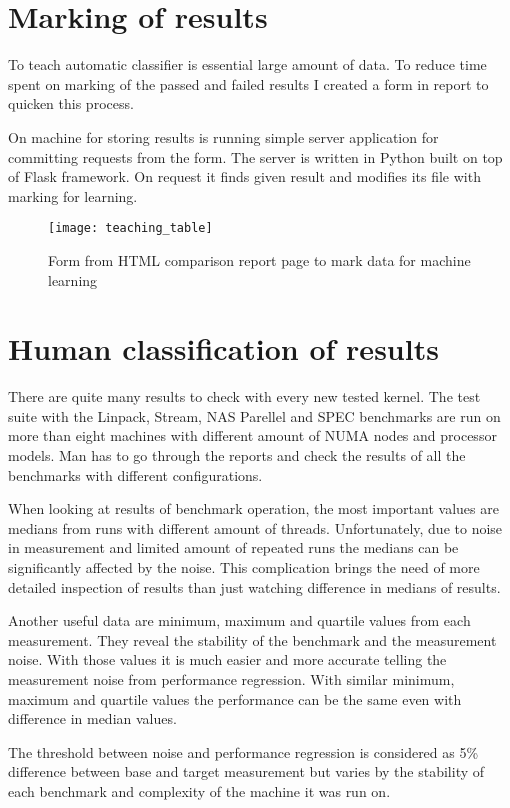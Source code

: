 \section{Marking of results}
To teach automatic classifier is essential large amount of data. To reduce
time spent on marking of the passed and failed results I created a form in
report to quicken this process.

On machine for storing results is running simple server application for
committing requests from the form. The server is written in Python built on top
of Flask framework. On request it finds given result and modifies its file with
marking for learning.

\begin{figure}
  \centering
  \texttt{[image: teaching\_table]}
  \caption{Form from HTML comparison report page to mark data for machine learning}
\end{figure}

\section{Human classification of results}
There are quite many results to check with every new tested kernel. The test
suite with the Linpack, Stream, NAS Parellel and SPEC benchmarks are run on more
than eight machines with different amount of NUMA nodes and processor models.
Man has to go through the reports and check the results of all the benchmarks
with different configurations.

When looking at results of benchmark operation, the most important values are
medians from runs with different amount of threads. Unfortunately, due to noise in measurement
and limited amount of repeated runs the medians can be significantly affected by
the noise. This complication brings the need of more detailed inspection of
results than just watching difference in medians of results.

Another useful data are minimum, maximum and quartile values from each
measurement. They reveal the stability of the benchmark and the measurement
noise. With those values it is much easier and more accurate telling the
measurement noise from performance regression. With similar minimum, maximum and
quartile values the performance can be the same even with difference in median values.

The threshold between noise and performance regression is considered as 5\%
difference between base and target measurement but varies by the stability of
each benchmark and complexity of the machine it was run on.

